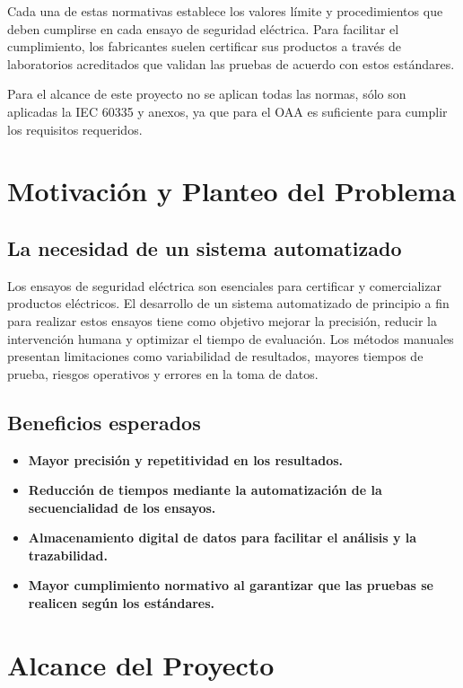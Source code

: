 \documentclass[a4paper,12pt]{article}
\begin{document}
\noindent Cada una de estas normativas establece los valores límite y procedimientos que deben cumplirse en cada ensayo de seguridad eléctrica. Para facilitar el cumplimiento, los fabricantes suelen certificar sus productos a través de laboratorios acreditados que validan las pruebas de acuerdo con estos estándares.

\vspace{0.3cm} \noindent Para el alcance de este proyecto no se aplican todas las normas, sólo son aplicadas la IEC 60335 y anexos, ya que para el OAA es suficiente para cumplir los requisitos requeridos.


\section{Motivación y Planteo del Problema}
\subsection{La necesidad de un sistema automatizado}
Los ensayos de seguridad eléctrica son esenciales para certificar y comercializar productos
eléctricos.
El desarrollo de un sistema automatizado de principio a fin para realizar estos ensayos tiene como objetivo mejorar la precisión, reducir la intervención humana y optimizar el tiempo de evaluación.  Los métodos manuales presentan limitaciones como variabilidad de resultados,
mayores tiempos de prueba, riesgos operativos y errores en la toma de datos.

\subsection{Beneficios esperados}
\begin{itemize}
    \item \textbf{Mayor precisión y repetitividad en los resultados.}
    \item \textbf{Reducción de tiempos mediante la automatización de la secuencialidad de los ensayos.}
    \item \textbf{Almacenamiento digital de datos para facilitar el análisis y la trazabilidad.}
    \item \textbf{Mayor cumplimiento normativo al garantizar que las pruebas se realicen según los estándares.}
\end{itemize}

\section{Alcance del Proyecto}
\end{document}
